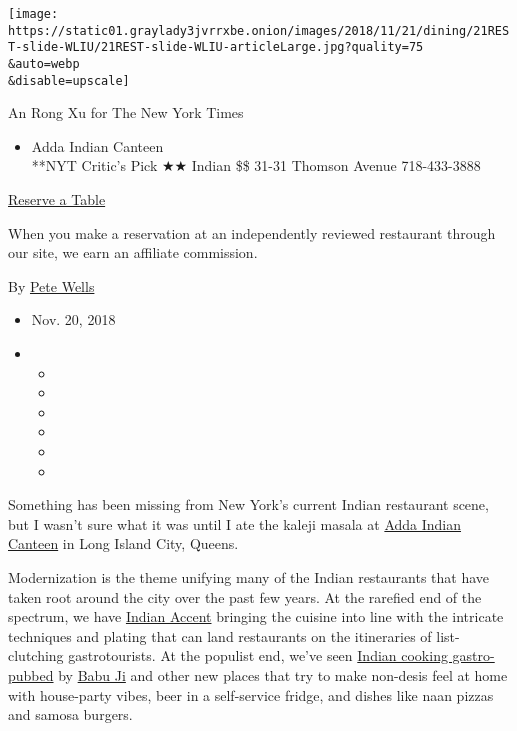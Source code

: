 \texttt{[image: https://static01.graylady3jvrrxbe.onion/images/2018/11/21/dining/21REST-slide-WLIU/21REST-slide-WLIU-articleLarge.jpg?quality=75\\\&auto=webp\\\&disable=upscale]}

An Rong Xu for The New York Times

\begin{itemize}
\tightlist
\item
  Adda Indian Canteen\\
  **NYT Critic's Pick ★★ Indian \$\$ 31-31 Thomson Avenue 718-433-3888
\end{itemize}

\href{https://www.yelp.com/reservations/adda-long-island-city}{Reserve a
Table}

When you make a reservation at an independently reviewed restaurant
through our site, we earn an affiliate commission.

By \href{https://www.nytimes3xbfgragh.onion/by/pete-wells}{Pete Wells}

\begin{itemize}
\item
  Nov. 20, 2018
\item
  \begin{itemize}
  \item
  \item
  \item
  \item
  \item
  \item
  \end{itemize}
\end{itemize}

Something has been missing from New York's current Indian restaurant
scene, but I wasn't sure what it was until I ate the kaleji masala at
\href{https://www.addanyc.com/}{Adda Indian Canteen} in Long Island
City, Queens.

Modernization is the theme unifying many of the Indian restaurants that
have taken root around the city over the past few years. At the rarefied
end of the spectrum, we have
\href{https://www.nytimes3xbfgragh.onion/2016/05/25/dining/indian-accent-restaurant-review.html}{Indian
Accent} bringing the cuisine into line with the intricate techniques and
plating that can land restaurants on the itineraries of list-clutching
gastrotourists. At the populist end, we've seen
\href{https://www.nytimes3xbfgragh.onion/2018/03/13/dining/indian-restaurants-manhattan-babu-ji.html}{Indian
cooking gastro-pubbed} by
\href{https://www.nytimes3xbfgragh.onion/2015/09/09/dining/hungry-city-babu-ji-east-village.html}{Babu
Ji} and other new places that try to make non-desis feel at home with
house-party vibes, beer in a self-service fridge, and dishes like naan
pizzas and samosa burgers.

